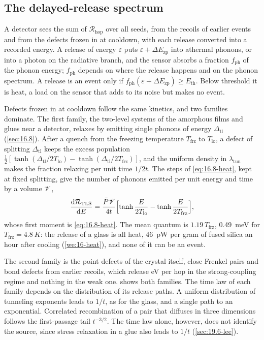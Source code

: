 \subsection{The delayed-release spectrum}\label{sec:19.6-spectrum}

A detector sees the sum of $\mathcal{R}_{\mathrm{hop}}$ over all seeds, from the recoils of earlier events and from the defects frozen in at cooldown, with each release converted into a recorded energy. A release of energy $\varepsilon$ puts $\varepsilon + \Delta E_{\mathrm{zp}}$ into athermal phonons, or into a photon on the radiative branch, and the sensor absorbs a fraction $f_{\mathrm{ph}}$ of the phonon energy; $f_{\mathrm{ph}}$ depends on where the release happens and on the phonon spectrum. A release is an event only if $f_{\mathrm{ph}}(\varepsilon + \Delta E_{\mathrm{zp}}) \ge E_{\mathrm{th}}$. Below threshold it is heat, a load on the sensor that adds to its noise but makes no event.

Defects frozen in at cooldown follow the same kinetics, and two families dominate. The first family, the two-level systems of the amorphous films and glues near a detector, relaxes by emitting single phonons of energy $\Delta_{\mathrm{tl}}$ (\cref{sec:16.8}). After a quench from the freezing temperature $T_{\mathrm{frz}}$ to $T_{\mathrm{lo}}$, a defect of splitting $\Delta_{\mathrm{tl}}$ keeps the excess population $\frac12[\tanh(\Delta_{\mathrm{tl}}/2T_{\mathrm{lo}}) - \tanh(\Delta_{\mathrm{tl}}/2T_{\mathrm{frz}})]$, and the uniform density in $\lambda_{\mathrm{tun}}$ makes the fraction relaxing per unit time $1/2t$. The steps of \cref{eq:16.8-heat}, kept at fixed splitting, give the number of phonons emitted per unit energy and time by a volume $\mathscr{V}$,
\begin{equation}
  \frac{\mathrm{d}\mathcal{R}_{\mathrm{TLS}}}{\mathrm{d} E} = \frac{\bar P\mathscr{V}}{4t}\Bigl[\tanh\frac{E}{2T_{\mathrm{lo}}} - \tanh\frac{E}{2T_{\mathrm{frz}}}\Bigr] ,
  \label{eq:19.6-tls}
\end{equation}
whose first moment is \cref{eq:16.8-heat}. The mean quantum is $1.19\,T_{\mathrm{frz}}$, \SI{0.49}{meV} for $T_{\mathrm{frz}} = \SI{4.8}{K}$: the release of a glass is all heat, \SI{46}{pW} per gram of fused silica an hour after cooling (\cref{we:16-heat}), and none of it can be an event.

The second family is the point defects of the crystal itself, close Frenkel pairs and bond defects from earlier recoils, which release eV per hop in the strong-coupling regime and nothing in the weak one.  shows both families. The time law of each family depends on the distribution of its release paths. A uniform distribution of tunneling exponents leads to $1/t$, as for the glass, and a single path to an exponential. Correlated recombination of a pair that diffuses in three dimensions follows the first-passage tail $t^{-3/2}$. The time law alone, however, does not identify the source, since stress relaxation in a glue also leads to $1/t$ (\cref{sec:19.6-lee}).

